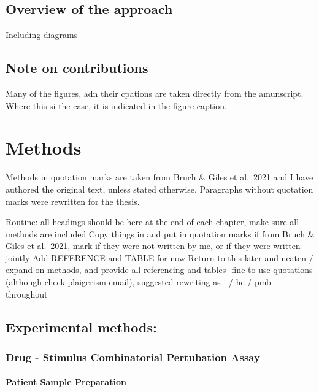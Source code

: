 \documentclass[11pt, a4paper, twosided]{book}
\begin{document}
\hypertarget{overview-of-the-approach}{%
\section{Overview of the approach}\label{overview-of-the-approach}}

Including diagrams

\hypertarget{note-on-contributions}{%
\section{Note on contributions}\label{note-on-contributions}}

Many of the figures, adn their cpations are taken directly from the amunscript. Where this si the case, it is indicated in the figure caption.

\hypertarget{methods}{%
\chapter{Methods}\label{methods}}

Methods in quotation marks are taken from Bruch \& Giles et al.~2021 and I have authored the original text, unless stated otherwise. Paragraphs without quotation marks were rewritten for the thesis.

Routine:
all headings should be here
at the end of each chapter, make sure all methods are included
Copy things in and put in quotation marks if from Bruch \& Giles et al.~2021, mark if they were not written by me, or if they were written jointly
Add REFERENCE and TABLE for now
Return to this later and neaten / expand on methods, and provide all referencing and tables
-fine to use quotations (although check plaigerism email), suggested rewriting as i / he / pmb throughout

\hypertarget{experimental-methods}{%
\section{Experimental methods:}\label{experimental-methods}}

\hypertarget{drug---stimulus-combinatorial-pertubation-assay}{%
\subsection{Drug - Stimulus Combinatorial Pertubation Assay}\label{drug---stimulus-combinatorial-pertubation-assay}}

\hypertarget{patient-sample-preparation}{%
\subsubsection{Patient Sample Preparation}\label{patient-sample-preparation}}
\end{document}
